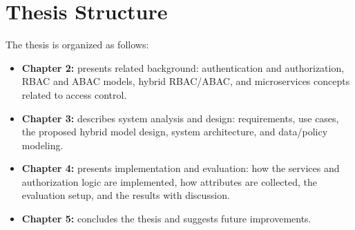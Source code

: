\section{Thesis Structure}
The thesis is organized as follows:
\begin{itemize}
    \item \textbf{Chapter 2:} presents related background: authentication and authorization, RBAC and ABAC models, hybrid RBAC/ABAC, and microservices concepts related to access control.
    \item \textbf{Chapter 3:} describes system analysis and design: requirements, use cases, the proposed hybrid model design, system architecture, and data/policy modeling.
    \item \textbf{Chapter 4:} presents implementation and evaluation: how the services and authorization logic are implemented, how attributes are collected, the evaluation setup, and the results with discussion.
    \item \textbf{Chapter 5:} concludes the thesis and suggests future improvements.
\end{itemize}


